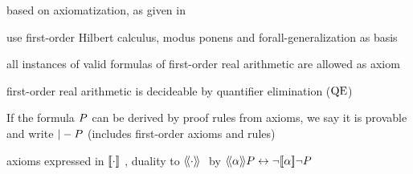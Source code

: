 \documentclass[10pt]{report}
\begin{document}
    based on \dL axiomatization, as given in \cite{Platzer12Complete}

    use first-order Hilbert calculus, modus ponens and forall-generalization as basis

    all instances of valid formulas of first-order real arithmetic are allowed as axiom

    first-order real arithmetic is decideable by quantifier elimination ($\operatorname{QE}$)

    If the \ddL formula $P$ can be derived by \ddL proof rules from \ddL axioms, we say it is provable and write $|-P$
    (includes first-order axioms and rules)

    axioms expressed in $\dbox{\cdot}$, duality to $\ddiamond{\cdot}$ by $\ddiamond{\asprg}{\asfml}\lbisubjunct\lnot\dbox{\asprg}{\lnot\asfml}$

\end{document}
